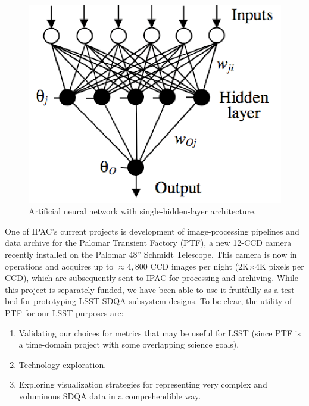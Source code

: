 \begin{figure}
\includegraphics[scale=0.5,bb=0 0 363 285]{images/O7A2_2}
\caption{Artificial neural network with single-hidden-layer architecture.} 
 \label{ANN}
\end{figure}


One of IPAC's current projects is development of image-processing pipelines and data archive
for the Palomar Transient Factory (PTF), a new 12-CCD camera recently installed on the Palomar
48'' Schmidt Telescope.  This camera is now in operations and acquires up to $\approx 4,800$
CCD images per night (2K$\times$4K pixels per CCD), 
which are subsequently sent to IPAC for processing and archiving.  
While this project is separately funded, we have been able to use
it fruitfully as a test bed for prototyping LSST-SDQA-subsystem designs.  
To be clear, the utility of PTF for our LSST purposes are:

\begin{enumerate} 
\item{Validating our choices for metrics that may be useful for LSST (since PTF is a 
time-domain project with some overlapping science goals).}
\item{Technology exploration.}
\item{Exploring visualization strategies for representing very complex and 
voluminous SDQA data in a comprehendible way.}
\end{enumerate} 

